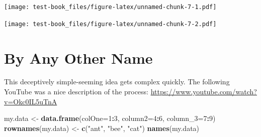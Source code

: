 \documentclass[]{book}
\newenvironment{Shaded}{\begin{snugshade}}{\end{snugshade}}
\newcommand{\CommentTok}[1]{\textcolor[rgb]{0.56,0.35,0.01}{\textit{#1}}}
\newcommand{\DataTypeTok}[1]{\textcolor[rgb]{0.13,0.29,0.53}{#1}}
\newcommand{\DecValTok}[1]{\textcolor[rgb]{0.00,0.00,0.81}{#1}}
\newcommand{\KeywordTok}[1]{\textcolor[rgb]{0.13,0.29,0.53}{\textbf{#1}}}
\newcommand{\NormalTok}[1]{#1}
\newcommand{\OperatorTok}[1]{\textcolor[rgb]{0.81,0.36,0.00}{\textbf{#1}}}
\newcommand{\StringTok}[1]{\textcolor[rgb]{0.31,0.60,0.02}{#1}}
\begin{document}
\texttt{[image: test-book\_files/figure-latex/unnamed-chunk-7-1.pdf]}

\begin{Shaded}
\end{Shaded}

\texttt{[image: test-book\_files/figure-latex/unnamed-chunk-7-2.pdf]}

\hypertarget{changenames}{%
\chapter{By Any Other Name}\label{changenames}}

This deceptively simple-seeming idea gets complex quickly. The following YouTube was a nice description of the process: \url{https://www.youtube.com/watch?v=Okc0IL5uTnA}

\begin{Shaded}
\begin{Highlighting}[]
\NormalTok{my.data <-}\StringTok{ }\KeywordTok{data.frame}\NormalTok{(}\DataTypeTok{colOne=}\DecValTok{1}\OperatorTok{:}\DecValTok{3}\NormalTok{, }\DataTypeTok{column2=}\DecValTok{4}\OperatorTok{:}\DecValTok{6}\NormalTok{, }\DataTypeTok{column_3=}\DecValTok{7}\OperatorTok{:}\DecValTok{9}\NormalTok{)}
\KeywordTok{rownames}\NormalTok{(my.data) <-}\StringTok{ }\KeywordTok{c}\NormalTok{(}\StringTok{"ant"}\NormalTok{, }\StringTok{"bee"}\NormalTok{, }\StringTok{"cat"}\NormalTok{)}
\KeywordTok{names}\NormalTok{(my.data)}
\end{Highlighting}
\end{Shaded}
\end{document}
